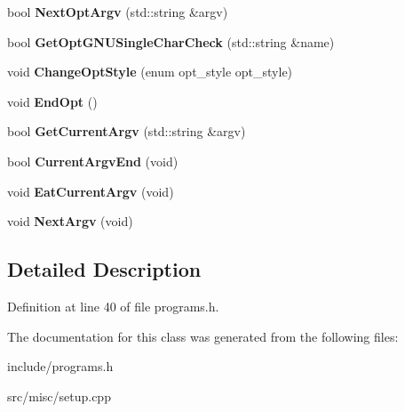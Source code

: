 \begin{DoxyCompactItemize}
\item 
\hypertarget{classCommandLine_a090151cab04fbb6e886f2053e2ef56a3}{bool {\bfseries Next\-Opt\-Argv} (std\-::string \&argv)}\label{classCommandLine_a090151cab04fbb6e886f2053e2ef56a3}

\item 
\hypertarget{classCommandLine_ac94cc029aca101fb5e39189fca40ff91}{bool {\bfseries Get\-Opt\-G\-N\-U\-Single\-Char\-Check} (std\-::string \&name)}\label{classCommandLine_ac94cc029aca101fb5e39189fca40ff91}

\item 
\hypertarget{classCommandLine_ac0f91f63b77400b7266128dbc1445b1b}{void {\bfseries Change\-Opt\-Style} (enum opt\-\_\-style opt\-\_\-style)}\label{classCommandLine_ac0f91f63b77400b7266128dbc1445b1b}

\item 
\hypertarget{classCommandLine_a941c71120faefc5e3c0876d69ac78491}{void {\bfseries End\-Opt} ()}\label{classCommandLine_a941c71120faefc5e3c0876d69ac78491}

\item 
\hypertarget{classCommandLine_a331a3c1e87e6a2c0306cf1e9f7a67945}{bool {\bfseries Get\-Current\-Argv} (std\-::string \&argv)}\label{classCommandLine_a331a3c1e87e6a2c0306cf1e9f7a67945}

\item 
\hypertarget{classCommandLine_ad457fad3218a71163a058bc095cfe0ed}{bool {\bfseries Current\-Argv\-End} (void)}\label{classCommandLine_ad457fad3218a71163a058bc095cfe0ed}

\item 
\hypertarget{classCommandLine_ab34d4cf4cb665ecb694f90e5f9c524c3}{void {\bfseries Eat\-Current\-Argv} (void)}\label{classCommandLine_ab34d4cf4cb665ecb694f90e5f9c524c3}

\item 
\hypertarget{classCommandLine_a89dd608d9095a3321d48eb90ecf210ba}{void {\bfseries Next\-Argv} (void)}\label{classCommandLine_a89dd608d9095a3321d48eb90ecf210ba}

\end{DoxyCompactItemize}


\subsection{Detailed Description}


Definition at line 40 of file programs.\-h.



The documentation for this class was generated from the following files\-:\begin{DoxyCompactItemize}
\item 
include/programs.\-h\item 
src/misc/setup.\-cpp\end{DoxyCompactItemize}
